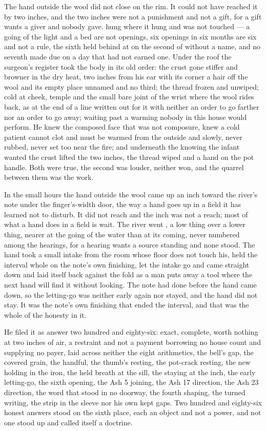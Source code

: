 The hand outside the wool did not close on the rim. It could not have reached it by two inches, and the two inches were not a punishment and not a gift, for a gift wants a giver and nobody gave.  hung where it hung and was not touched --- a going of the light and a bed are not openings, six openings in six months are six and not a rule, the sixth held behind at  on the second of  without a name, and no seventh made due on a day that had not earned one. Under the roof the surgeon's register took the body in its old order: the crust gone stiffer and browner in the dry heat, two inches from his ear with its corner a hair off the wool and its empty place unnamed and no third; the thread frozen and unwiped; cold at cheek, temple and the small bare joint of the wrist where the wool rides back, as at the end of a line written out for it with neither an order to go farther nor an order to go away;  waiting past a warming nobody in this house would perform. He knew the composed face that was not composure, knew a cold patient cannot clot and must be warmed from the outside and slowly, never rubbed, never set too near the fire; and underneath the knowing the infant wanted the crust lifted the two inches, the thread wiped and a hand on the pot handle. Both were true, the second was louder, neither won, and the quarrel between them was the work.

\scenebreak

In the small hours the hand outside the wool came up an inch toward the river's note under the finger's-width door, the way a hand goes up in a field it has learned not to disturb. It did not reach and the inch was not a reach; most of what a hand does in a field is wait. The river went , a low thing over a lower thing, nearer at the going of the water than at its coming, never numbered among the hearings, for a hearing wants a source standing and none stood. The hand took a small intake from the room whose floor does not touch his, held the interval whole on the note's own finishing, let the intake go and came straight down and laid itself back against the fold as a man puts away a tool where the next hand will find it without looking. The note had done before the hand came down, so the letting-go was neither early again nor stayed, and the hand did not stay. It was the note's own finishing that ended the interval, and that was the whole of the honesty in it.

He filed it as answer two hundred and eighty-six: exact, complete, worth nothing at two inches of air, a restraint and not a payment borrowing no house count and supplying no payer, laid across neither the eight arithmetics, the bell's gap, the covered grain, the handful, the thumb's resting, the pot-crack resting, the new holding in the iron, the held breath at the sill, the staying at the inch, the early letting-go, the sixth opening, the Ash 5 joining, the Ash 17 direction, the Ash 23 direction, the word that stood in no doorway, the fourth shaping, the turned writing, the strip in the sleeve nor his own kept gaps. Two hundred and eighty-six honest answers stood on the sixth place, each an object and not a power, and not one stood up and called itself a doctrine.


